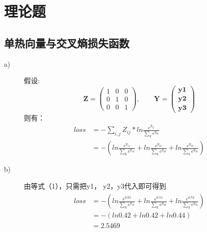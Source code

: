 \documentclass{article}
\begin{document}
\section{理论题}
\subsection{单热向量与交叉熵损失函数}
\begin{description}
    \item[a)]  假设:
    \begin{displaymath}
        \mathbf{Z} =
        \left( \begin{array}{ccc}
        1 & 0 & 0 \\
        0 & 1 & 0 \\
        0 & 0 & 1
        \end{array} \right),\qquad
        \mathbf{Y} =
        \left( \begin{array}{ccc}
        \mathbf{y1} \\
        \mathbf{y2} \\
        \mathbf{y3}
        \end{array} \right)
    \end{displaymath}
    则有：
    \begin{equation}
        \begin{aligned}
        loss &= -\sum_{i,j}Z_{ij}*ln\frac{e^{y_{ij}}}{\sum_{k}e^{y_{ik}}}\\
             &= -(ln\frac{e^{y_{11}}}{\sum_{k}e^{y_{1k}}}+ln\frac{e^{y_{22}}}{\sum_{k}e^{y_{2k}}}+ln\frac{e^{y_{33}}}{\sum_{k}e^{y_{3k}}})
        \end{aligned}
    \end{equation} 
    \item[b)] 由等式（1），只需把y1， y2，y3代入即可得到
    \begin{eqnarray*}
        \begin{aligned}
        loss &= -(ln\frac{e^{0.65}}{\sum_{k}e^{y_{1k}}}+ln\frac{e^{0.51}}{\sum_{k}e^{y_{2k}}}+ln\frac{e^{0.72}}{\sum_{k}e^{y_{3k}}})\\
             &= -(ln0.42+ln0.42+ln0.44)\\
             &= 2.5469
        \end{aligned}
    \end{eqnarray*}
\end{description}
\end{document}
